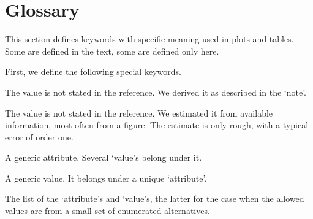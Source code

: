 \documentclass[aps, prx, showpacs, twocolumn, superscriptaddress, notitlepage, longbibliography, floatfix, nofootinbib]{revtex4-2}
\newcommand{\estimated}{\textit{(estimated) }}
\newcommand{\derived}{\textit{(derived) }}
\newif\ifIncremental
\newcommand{\myKey}[1]{$\whitearrowupfrombar$\textit{#1}}
\renewcommand{\myKey}[1]{\textit{#1}}
\renewcommand{\myKey}[1]{`{#1}'}
\newcommand{\key}[1]{$\whitearrowupfrombar$\textit{#1}}
\newcommand{\val}[1]{\rotatebox[origin=c]{180}{$\whitearrowupfrombar$}\textit{#1}}
\renewcommand{\key}[1]{\myKey{#1}}
\renewcommand{\val}[1]{\myKey{#1}}
\newcommand{\separate}[1]
{
 #1
}
\begin{document}
\renewcommand{\separate}[1]
{
 \vspace{0.5cm}
  \vspace{0.5cm}
  \noindent 
 #1
 \vspace{0.5cm}
  \vspace{0.5cm}
}

\section{Glossary}

\label{sec:vocabulary}

\newcommand{\keyword}[2]{\myKey{#1}. #2\\}

This section defines keywords with specific meaning used in plots and tables. Some are defined in the text, some are defined only here. 

\separate{First, we define the following special keywords.}

\begin{description}[leftmargin=5mm, topsep=0mm]
\item[\val{\derived}] The value is not stated in the reference.  We derived it as described in the \val{note}.
\item[\val{\estimated}] The value is not stated in the reference. We estimated it from available information, most often from a figure. The estimate is only rough, with a typical error of order one.
\item[\key{attribute}] A generic attribute. Several \val{value}s belong under it.
\item[\key{value}] A generic value. It belongs under a unique \val{attribute}.
\end{description}

\separate{The list of the \val{attribute}s and \val{value}s, the latter for the case when the allowed values are from a small set of enumerated alternatives.}

\begin{description}[leftmargin=5mm, topsep=0mm]

\end{description}

\onecolumngrid


\ifIncremental

\else

\fi
\end{document}
